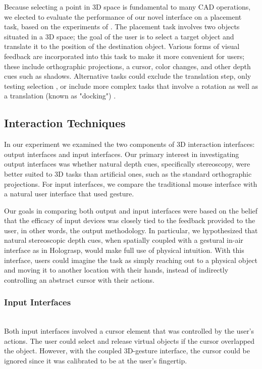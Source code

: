 \documentclass[pageno]{jpaper}
\begin{document}
Because selecting a point in 3D space is fundamental to many CAD operations, we elected to
evaluate the performance of our novel interface on a placement task, based on the experiments
of \cite{study1, study2}. The placement task involves two objects situated in a 3D space; the
goal of the user is to select a target object and translate it to the position of the
destination object. Various forms of visual feedback are incorporated into this task to
make it more convenient for users; these include orthographic projections, a cursor, color
changes, and other depth cues such as shadows. Alternative tasks could exclude the
translation step, only testing selection \cite{holodesk}, or include more complex tasks
that involve a rotation as well as a translation (known as "docking") \cite{masliah2000measuring}.

\subsection{Interaction Techniques}
In our experiment we examined the two components of 3D interaction interfaces: output interfaces and
input interfaces. Our primary interest in investigating output interfaces was whether natural depth cues,
specifically stereoscopy, were better suited to 3D tasks than artificial ones, such as the
standard orthographic projections. For input interfaces, we compare the traditional
mouse interface with a natural user interface that used gesture.

Our goals in comparing both output and input interfaces were based on the belief that the
efficacy of input devices was closely tied to the feedback provided to the user, in other words, the
output methodology. In particular, we hypothesized that natural stereoscopic
depth cues, when spatially coupled with a gestural in-air interface as in Holograsp, would make full use of
physical intuition. With this interface, users could imagine the task as simply reaching
out to a physical object and moving it to another location with their hands, instead of
indirectly controlling an abstract cursor with their actions.

\subsubsection{Input Interfaces}$ $\\
Both input interfaces involved a cursor element that was controlled by the user's actions. The user
could select and release virtual objects if the cursor overlapped the object.
However, with the coupled 3D-gesture interface, the cursor could be ignored since it was
calibrated to be at the user's fingertip.
\end{document}
